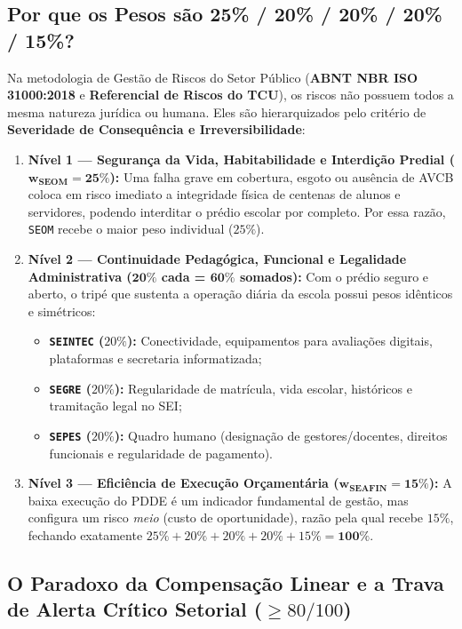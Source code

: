\documentclass[9pt,a4paper]{extarticle}
\begin{document}
\subsection{Por que os Pesos são 25\% / 20\% / 20\% / 20\% / 15\%?}

Na metodologia de Gestão de Riscos do Setor Público (\textbf{ABNT NBR ISO 31000:2018} e \textbf{Referencial de Riscos do TCU}), os riscos não possuem todos a mesma natureza jurídica ou humana. Eles são hierarquizados pelo critério de \textbf{Severidade de Consequência e Irreversibilidade}:

\begin{enumerate}[leftmargin=1.5em, itemsep=4pt]
    \item \textbf{Nível 1 --- Segurança da Vida, Habitabilidade e Interdição Predial ($\mathbf{w_{\text{SEOM}} = 25\%}$):}
    Uma falha grave em cobertura, esgoto ou ausência de AVCB coloca em risco imediato a integridade física de centenas de alunos e servidores, podendo interditar o prédio escolar por completo. Por essa razão, \texttt{SEOM} recebe o maior peso individual ($25\%$).
    \item \textbf{Nível 2 --- Continuidade Pedagógica, Funcional e Legalidade Administrativa ($\mathbf{20\%}$ cada = $\mathbf{60\%}$ somados):}
    Com o prédio seguro e aberto, o tripé que sustenta a operação diária da escola possui pesos idênticos e simétricos:
    \begin{itemize}[nosep, leftmargin=1.5em]
        \item \textbf{\texttt{SEINTEC} ($20\%$):} Conectividade, equipamentos para avaliações digitais, plataformas e secretaria informatizada;
        \item \textbf{\texttt{SEGRE} ($20\%$):} Regularidade de matrícula, vida escolar, históricos e tramitação legal no SEI;
        \item \textbf{\texttt{SEPES} ($20\%$):} Quadro humano (designação de gestores/docentes, direitos funcionais e regularidade de pagamento).
    \end{itemize}
    \item \textbf{Nível 3 --- Eficiência de Execução Orçamentária ($\mathbf{w_{\text{SEAFIN}} = 15\%}$):}
    A baixa execução do PDDE é um indicador fundamental de gestão, mas configura um risco \emph{meio} (custo de oportunidade), razão pela qual recebe $15\%$, fechando exatamente $25\% + 20\% + 20\% + 20\% + 15\% = \mathbf{100\%}$.
\end{enumerate}

\subsection{O Paradoxo da Compensação Linear e a Trava de Alerta Crítico Setorial ($\ge 80/100$)}
\end{document}
